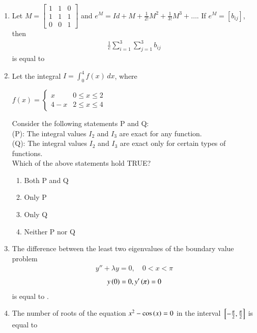\documentclass[journal]{IEEEtran}
\begin{document}
\begin{enumerate}[start=1]
\item Let $M = \begin{bmatrix} 1 & 1 & 0 \\ 1 & 1 & 1 \\ 0 & 0 & 1 \end{bmatrix}$ and $e^M = Id + M + \frac{1}{2!} M^2 + \frac{1}{3!} M^3 + \dots$. If $e^M = [b_{ij}]$, then
\begin{align*}
\frac{1}{e} \sum_{i=1}^3 \sum_{j=1}^3 b_{ij}
\end{align*}
is equal to \underline{\hspace{2cm}}\\

\item Let the integral $I = \int_0^4 f(x) \, dx$, where 

$f(x) = 
\begin{cases} 
x & 0 \leq x \leq 2 \\ 
4 - x & 2 \leq x \leq 4 
\end{cases}$

Consider the following statements P and Q:\\
(P): The integral values \( I_2 \) and \( I_3 \) are exact for any function.\\
(Q): The integral values \( I_2 \) and \( I_3 \) are exact only for certain types of functions.\\

Which of the above statements hold TRUE?
\begin{multicols}{2}
\begin{enumerate}
    \item Both P and Q
    \item Only P
    \item Only Q
    \item Neither P nor Q
\end{enumerate}
\end{multicols}

\item The difference between the least two eigenvalues of the boundary value problem
\begin{align*}
y'' + \lambda y = 0, \quad 0 < x < \pi
\end{align*}
\begin{align*}
y\left(0\right) = 0,  y'\left(\pi\right) = 0
\end{align*}
is equal to \underline{\hspace{2cm}}.

\item The number of roots of the equation $x^2 - \cos\left(x\right) = 0$ in the interval ${}\left[-\frac{\pi}{2}, \frac{\pi}{2} \right]$ is equal to \underline{\hspace{2cm}}\\


\end{enumerate}
\end{document}
